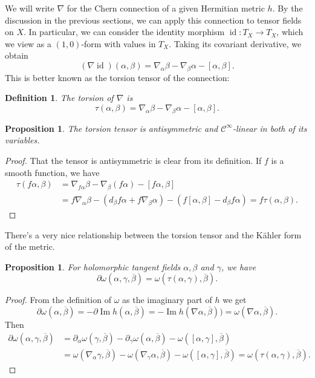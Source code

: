 \documentclass[10pt,a4paper]{article}
\newtheorem{prop}[theo]{Proposition}
\newtheorem{defi}[theo]{Definition}
\newtheorem*{proof}{Proof}
\newcommand{\cc}[1]{\mathcal{#1}}
\def\qedhere{}
\def\ov#1{\overline{#1}}
\DeclareMathOperator{\im}{Im}
\DeclareMathOperator{\id}{id}
\begin{document}
We will write $\nabla$ for the Chern connection of a given Hermitian metric $h$. By the discussion in the previous sections, we can apply this connection to tensor fields on $X$. In particular, we can consider the identity morphism $\id : T_X \to T_X$, which we view as a $(1,0)$-form with values in $T_X$. Taking its covariant derivative, we obtain
$$
(\nabla \id)(\alpha, \beta)
= \nabla_\alpha \beta - \nabla_\beta \alpha - [\alpha, \beta].
$$
This is better known as the torsion tensor of the connection:

\begin{defi}
The \emph{torsion} of $\nabla$ is
$$
\tau(\alpha,\beta)
= \nabla_\alpha \beta - \nabla_\beta \alpha - [\alpha, \beta].
$$
\end{defi}

\begin{prop}
The torsion tensor is antisymmetric and $\cc C^\infty$-linear in both of its variables.
\end{prop}

\begin{proof}
That the tensor is antisymmetric is clear from its definition. If $f$ is a smooth function, we have
\begin{align*}
\tau(f\alpha,\beta)
&= \nabla_{f\alpha}\beta - \nabla_\beta(f\alpha) - [f\alpha,\beta]
\\
&= f\nabla_\alpha \beta - (d_\beta f \alpha + f \nabla_\beta \alpha) - (f[\alpha,\beta] - d_\beta f \alpha)
= f \tau(\alpha,\beta).
\qedhere
\end{align*}
\end{proof}

There's a very nice relationship between the torsion tensor and the K\"ahler form of the metric.

\begin{prop}
For holomorphic tangent fields $\alpha, \beta$ and $\gamma$, we have
\[
\partial\omega(\alpha,\gamma,\ov\beta)
= \omega(\tau(\alpha,\gamma), \ov\beta).
\]
\end{prop}

\begin{proof}
From the definition of $\omega$ as the imaginary part of $h$ we get
\[
\partial\omega(\alpha,\ov\beta)
= -\partial\im h(\alpha, \ov\beta)
= -\im h(\nabla\alpha,\ov\beta))
= \omega(\nabla\alpha,\ov\beta).
\]
Then
\begin{align*}
\partial\omega(\alpha,\gamma,\ov\beta)
&= \partial_\alpha\omega(\gamma,\ov\beta)
- \partial_\gamma\omega(\alpha,\ov\beta)
- \omega([\alpha,\gamma], \ov\beta)
\\
&= \omega(\nabla_\alpha\gamma, \ov\beta)
- \omega(\nabla_\gamma\alpha, \ov\beta)
- \omega([\alpha,\gamma], \ov\beta)
= \omega(\tau(\alpha,\gamma), \ov\beta).
\end{align*}
\end{proof}
\end{document}
